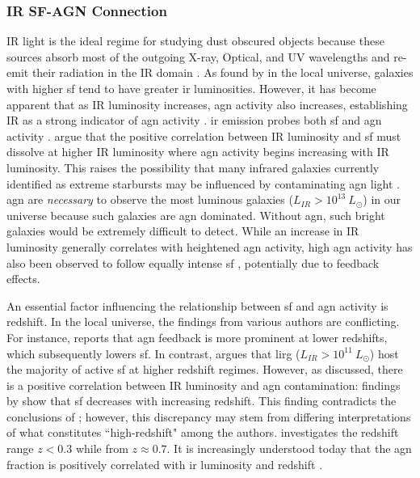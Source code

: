 \subsubsection{IR SF-AGN Connection}
IR light is the ideal regime for studying dust obscured objects because these sources absorb most of the outgoing X-ray, Optical, and UV wavelengths and re-emit their radiation in the IR domain \citep{wu_mid-infrared_2011, toba_9_2013, oconnor_luminosity_2016}. As found by \cite{valiante_backward_2009} in the local universe, galaxies with higher \gls{sf} tend to have greater \gls{ir} luminosities. However, it has become apparent that as IR luminosity increases, \gls{agn} activity also increases, establishing IR as a strong indicator of \gls{agn} activity \citep{huang_local_2007, biviano_spitzer_2011, katsianis_evolution_2017, symeonidis_agn_2021}. \gls{ir} emission probes both \gls{sf} and \gls{agn} activity \citep{fu_decomposing_2010}. \cite{symeonidis_agn_2021} argue that the positive correlation between IR luminosity and \gls{sf} must dissolve at higher IR luminosity where \gls{agn} activity begins increasing with IR luminosity. This raises the possibility that many infrared galaxies currently identified as extreme starbursts may be influenced by contaminating \gls{agn} light \citep{symeonidis_agn_2021}. \gls{agn} are \textit{necessary} to observe the most luminous galaxies ($L_{IR} > 10^{13} \ L_\odot$) in our universe because such galaxies are \gls{agn} dominated. Without \gls{agn}, such bright galaxies would be extremely difficult to detect. While an increase in IR luminosity generally correlates with heightened \gls{agn} activity, high \gls{agn} activity has also been observed to follow equally intense \gls{sf} \citep{hopkins_cosmological_2008}, potentially due to feedback effects.

An essential factor influencing the relationship between \gls{sf} and \gls{agn} activity is redshift. In the local universe, the findings from various authors are conflicting. For instance, \cite{katsianis_evolution_2017} reports that \gls{agn} feedback is more prominent at lower redshifts, which subsequently lowers \gls{sf}. In contrast, \cite{fu_decomposing_2010} argues that \gls{lirg} ($L_{IR} > 10^{11} \ L_\odot$) host the majority of active \gls{sf} at higher redshift regimes. However, as discussed, there is a positive correlation between IR luminosity and \gls{agn} contamination: findings by \cite{wu_mid-infrared_2011} show that \gls{sf} decreases with increasing redshift. This finding contradicts the conclusions of \cite{fu_decomposing_2010}; however, this discrepancy may stem from differing interpretations of what constitutes ``high-redshift" among the authors. \cite{wu_mid-infrared_2011} investigates the redshift range $z<0.3$ while \cite{fu_decomposing_2010} from $z\approx0.7$. It is increasingly understood today that the \gls{agn} fraction is positively correlated with \gls{ir} luminosity and redshift \citep{symeonidis_agn_2021}. 

